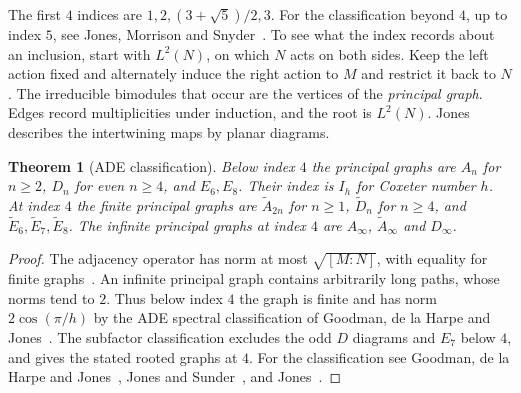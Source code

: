 \documentclass[11pt,a4paper]{article}
\newtheorem{thm}{Theorem}[section]
\begin{document}
The first $4$ indices are $1,2,(3+\sqrt5)/2,3$. For the classification beyond $4$, up to index $5$, see Jones, Morrison and Snyder~\cite{jms}. To see what the index records about an inclusion, start with $L^2(N)$, on which $N$ acts on both sides. Keep the left action fixed and alternately induce the right action to $M$ and restrict it back to $N$. The irreducible bimodules that occur are the vertices of the \emph{principal graph}. Edges record multiplicities under induction, and the root is $L^2(N)$. Jones~\cite{jones-planar} describes the intertwining maps by planar diagrams.

\begin{samepage}
\begin{thm}[ADE classification]
Below index $4$ the principal graphs are $A_n$ for $n\geq2$, $D_n$ for even $n\geq4$, and $E_6,E_8$. Their index is $I_h$ for Coxeter number $h$. At index $4$ the finite principal graphs are $\tilde A_{2n}$ for $n\geq1$, $\tilde D_n$ for $n\geq4$, and $\tilde E_6,\tilde E_7,\tilde E_8$. The infinite principal graphs at index $4$ are $A_\infty$, $\tilde A_\infty$ and $D_\infty$.
\end{thm}
\end{samepage}
\begin{proof}
The adjacency operator has norm at most $\sqrt{[M:N]}$, with equality for finite graphs~\cite{js}. An infinite principal graph contains arbitrarily long paths, whose norms tend to $2$. Thus below index $4$ the graph is finite and has norm $2\cos(\pi/h)$ by the ADE spectral classification of Goodman, de la Harpe and Jones~\cite{ghj}. The subfactor classification excludes the odd $D$ diagrams and $E_7$ below $4$, and gives the stated rooted graphs at $4$. For the classification see Goodman, de la Harpe and Jones~\cite{ghj}, Jones and Sunder~\cite{js}, and Jones~\cite{jones-planar}.
\end{proof}
\end{document}
